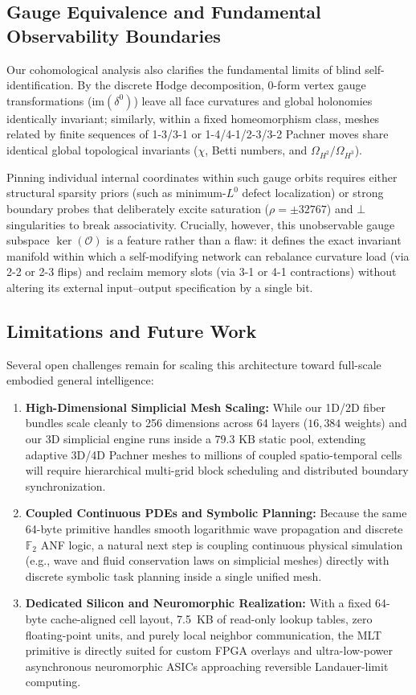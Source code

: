 \documentclass[11pt, a4paper]{article}
\begin{document}
\subsection{Gauge Equivalence and Fundamental Observability Boundaries}
Our cohomological analysis also clarifies the fundamental limits of blind self-identification. By the discrete Hodge decomposition, 0-form vertex gauge transformations ($\mathrm{im}(\delta^0)$) leave all face curvatures and global holonomies identically invariant; similarly, within a fixed homeomorphism class, meshes related by finite sequences of 1-3/3-1 or 1-4/4-1/2-3/3-2 Pachner moves share identical global topological invariants ($\chi$, Betti numbers, and $\Omega_{H^2}/\Omega_{H^3}$).

Pinning individual internal coordinates within such gauge orbits requires either structural sparsity priors (such as minimum-$L^0$ defect localization) or strong boundary probes that deliberately excite saturation ($\rho = \pm 32767$) and $\bot$ singularities to break associativity. Crucially, however, this unobservable gauge subspace $\ker(\mathcal{O})$ is a feature rather than a flaw: it defines the exact invariant manifold within which a self-modifying network can rebalance curvature load (via 2-2 or 2-3 flips) and reclaim memory slots (via 3-1 or 4-1 contractions) without altering its external input--output specification by a single bit.

\subsection{Limitations and Future Work}
Several open challenges remain for scaling this architecture toward full-scale embodied general intelligence:
\begin{enumerate}
    \item \textbf{High-Dimensional Simplicial Mesh Scaling:} While our 1D/2D fiber bundles scale cleanly to 256 dimensions across 64 layers ($16,384$ weights) and our 3D simplicial engine runs inside a $79.3\text{ KB}$ static pool, extending adaptive 3D/4D Pachner meshes to millions of coupled spatio-temporal cells will require hierarchical multi-grid block scheduling and distributed boundary synchronization.
    \item \textbf{Coupled Continuous PDEs and Symbolic Planning:} Because the same 64-byte primitive handles smooth logarithmic wave propagation and discrete $\mathbb{F}_2$ ANF logic, a natural next step is coupling continuous physical simulation (e.g., wave and fluid conservation laws on simplicial meshes) directly with discrete symbolic task planning inside a single unified mesh.
    \item \textbf{Dedicated Silicon and Neuromorphic Realization:} With a fixed 64-byte cache-aligned cell layout, 7.5~KB of read-only lookup tables, zero floating-point units, and purely local neighbor communication, the MLT primitive is directly suited for custom FPGA overlays and ultra-low-power asynchronous neuromorphic ASICs approaching reversible Landauer-limit computing.
\end{enumerate}
\end{document}

